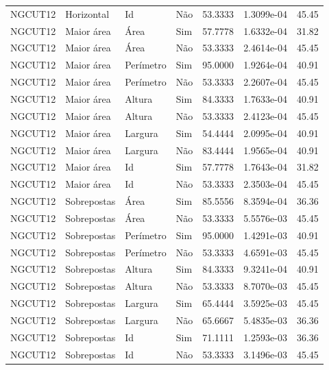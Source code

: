 \begin{tabular}{llllrrr}
NGCUT12   & Horizontal  & Id        & Não         & 53.3333      & 1.3099e-04 & 45.45    \\
NGCUT12   & Maior área  & Área      & Sim         & 57.7778      & 1.6332e-04 & 31.82    \\
NGCUT12   & Maior área  & Área      & Não         & 53.3333      & 2.4614e-04 & 45.45    \\
NGCUT12   & Maior área  & Perímetro & Sim         & 95.0000      & 1.9264e-04 & 40.91    \\
NGCUT12   & Maior área  & Perímetro & Não         & 53.3333      & 2.2607e-04 & 45.45    \\
NGCUT12   & Maior área  & Altura    & Sim         & 84.3333      & 1.7633e-04 & 40.91    \\
NGCUT12   & Maior área  & Altura    & Não         & 53.3333      & 2.4123e-04 & 45.45    \\
NGCUT12   & Maior área  & Largura   & Sim         & 54.4444      & 2.0995e-04 & 40.91    \\
NGCUT12   & Maior área  & Largura   & Não         & 83.4444      & 1.9565e-04 & 40.91    \\
NGCUT12   & Maior área  & Id        & Sim         & 57.7778      & 1.7643e-04 & 31.82    \\
NGCUT12   & Maior área  & Id        & Não         & 53.3333      & 2.3503e-04 & 45.45    \\
NGCUT12   & Sobrepostas & Área      & Sim         & 85.5556      & 8.3594e-04 & 36.36    \\
NGCUT12   & Sobrepostas & Área      & Não         & 53.3333      & 5.5576e-03 & 45.45    \\
NGCUT12   & Sobrepostas & Perímetro & Sim         & 95.0000      & 1.4291e-03 & 40.91    \\
NGCUT12   & Sobrepostas & Perímetro & Não         & 53.3333      & 4.6591e-03 & 45.45    \\
NGCUT12   & Sobrepostas & Altura    & Sim         & 84.3333      & 9.3241e-04 & 40.91    \\
NGCUT12   & Sobrepostas & Altura    & Não         & 53.3333      & 8.7070e-03 & 45.45    \\
NGCUT12   & Sobrepostas & Largura   & Sim         & 65.4444      & 3.5925e-03 & 45.45    \\
NGCUT12   & Sobrepostas & Largura   & Não         & 65.6667      & 5.4835e-03 & 36.36    \\
NGCUT12   & Sobrepostas & Id        & Sim         & 71.1111      & 1.2593e-03 & 36.36    \\
NGCUT12   & Sobrepostas & Id        & Não         & 53.3333      & 3.1496e-03 & 45.45    \\
\hline
\end{tabular}